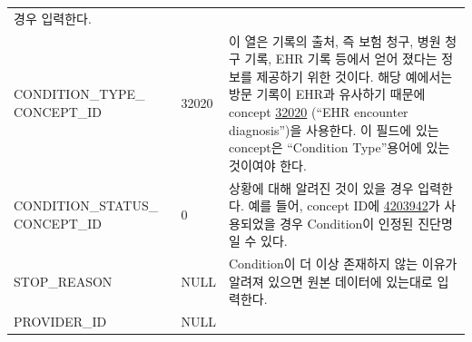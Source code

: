 \documentclass[11pt]{book}
\theoremstyle{definition}
\theoremstyle{definition}
\theoremstyle{definition}
\theoremstyle{remark}
\begin{document}
\begin{longtable}[]{@{}lll@{}}
\begin{minipage}[t]{0.48\columnwidth}
경우 입력한다.\strut
\end{minipage}\tabularnewline
\begin{minipage}[t]{0.28\columnwidth}\raggedright\strut
CONDITION\_TYPE\_ CONCEPT\_ID\strut
\end{minipage} & \begin{minipage}[t]{0.16\columnwidth}\raggedright\strut
32020\strut
\end{minipage} & \begin{minipage}[t]{0.48\columnwidth}\raggedright\strut
이 열은 기록의 출처, 즉 보험 청구, 병원 청구 기록, EHR 기록 등에서 얻어
졌다는 정보를 제공하기 위한 것이다. 해당 예에서는 방문 기록이 EHR과
유사하기 때문에 concept
\href{http://athena.ohdsi.org/search-terms/terms/32020}{32020} (``EHR
encounter diagnosis'')을 사용한다. 이 필드에 있는 concept은 ``Condition
Type''용어에 있는 것이여야 한다.\strut
\end{minipage}\tabularnewline
\begin{minipage}[t]{0.28\columnwidth}\raggedright\strut
CONDITION\_STATUS\_ CONCEPT\_ID\strut
\end{minipage} & \begin{minipage}[t]{0.16\columnwidth}\raggedright\strut
0\strut
\end{minipage} & \begin{minipage}[t]{0.48\columnwidth}\raggedright\strut
상황에 대해 알려진 것이 있을 경우 입력한다. 예를 들어, concept ID에
\href{http://athena.ohdsi.org/search-terms/terms/4203942}{4203942}가
사용되었을 경우 Condition이 인정된 진단명일 수 있다.\strut
\end{minipage}\tabularnewline
\begin{minipage}[t]{0.28\columnwidth}\raggedright\strut
STOP\_REASON\strut
\end{minipage} & \begin{minipage}[t]{0.16\columnwidth}\raggedright\strut
NULL\strut
\end{minipage} & \begin{minipage}[t]{0.48\columnwidth}\raggedright\strut
Condition이 더 이상 존재하지 않는 이유가 알려져 있으면 원본 데이터에
있는대로 입력한다.\strut
\end{minipage}\tabularnewline
\begin{minipage}[t]{0.28\columnwidth}\raggedright\strut
PROVIDER\_ID\strut
\end{minipage} & \begin{minipage}[t]{0.16\columnwidth}\raggedright\strut
NULL\strut
\end{minipage} & \begin{minipage}[t]{0.48\columnwidth}\raggedright\strut

\end{minipage}
\end{longtable}
\end{document}
